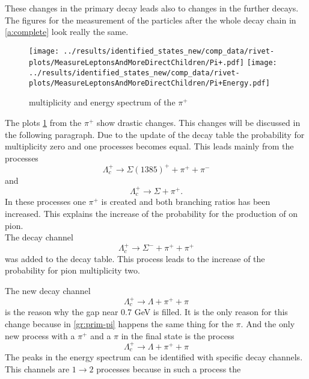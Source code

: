 These changes in the primary decay leads also to changes in the further decays.
The figures for the measurement of the particles after the whole decay chain 
in {\ref{a:complete}} look really the same.
\begin{figure}[h]
  \centering
  \texttt{[image: ../results/identified\_states\_new/comp\_data/rivet-plots/MeasureLeptonsAndMoreDirectChildren/Pi+.pdf]}
  \texttt{[image: ../results/identified\_states\_new/comp\_data/rivet-plots/MeasureLeptonsAndMoreDirectChildren/Pi+Energy.pdf]}
  \caption{multiplicity and energy spectrum of the \(\pi^+\)} \label{gr:prim-pip}
\end{figure}
The plots {\ref{gr:prim-pip}} from the \(\pi^+\) show drastic changes. This 
changes will be discussed in the following paragraph. Due to the update of 
the decay table the probability for multiplicity zero and one processes
becomes equal. This leads mainly from the processes
\begin{equation}
  \Lambda_c^+ \rightarrow \Sigma(1385)^+ + \pi^+ + \pi^- \nonumber
\end{equation} and 
\begin{equation}
  \Lambda_c^+ \rightarrow \Sigma + \pi^+. \nonumber
\end{equation}
In these processes one \(\pi^+\) is created and both branching ratios has been increased. This explains the 
increase of the probability for the production of on pion.\\
The decay channel
\begin{equation}
  \Lambda_c^+ \rightarrow \Sigma^- + \pi^+ + \pi^+ \nonumber
\end{equation}
was added to the decay table. This process leads to the increase of the probability for 
pion multiplicity two.
\par
The new decay channel
\begin{equation}
  \Lambda_c^+ \rightarrow \Lambda + \pi^+ + \pi \nonumber
\end{equation}
is the reason why the gap near 0.7 GeV is filled. It is the only reason for this 
change because in {\ref{gr:prim-pi}} happens the same thing for the \(\pi\).
And the only new process with a \(\pi^+\) and a \(\pi\) in the final state 
is the process
\begin{equation}
  \Lambda_c^+ \rightarrow \Lambda + \pi^+ + \pi \nonumber
\end{equation}
The peaks in the energy spectrum can be identified with specific decay channels.
This channels are \( 1 \rightarrow 2 \) processes because in such a process the 
